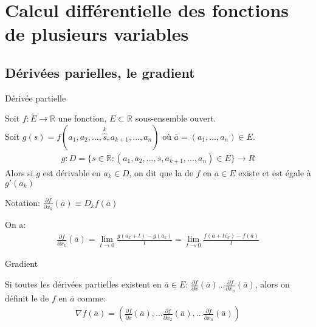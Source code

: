 \chapter{Calcul différentielle des fonctions de plusieurs variables}

    \section{Dérivées parielles, le gradient}
    \begin{parag}{Dérivée partielle}
        \begin{definition}
            Soit $f : E \to \mathbb{R}$ une fonction, $E \subset \mathbb{R}$ sous-ensemble ouvert. \\
        Soit $g(s) = f(a_1, a_2, \dots, \overbrace{s}^{k}, a_{k+1}, \dots, a_n)$ où $ \overline{a} = (a_1, \dots, a_n) \in E$.
        \begin{align*}
            g: D = \{ s \in \mathbb{R} : (a_1, a_2, \dots, s, a_{k+1}, \dots, a_n) \in E\} \to R
        \end{align*}
        Alors si $g$ est dérivable en $a_k \in D$, on dit que la  de $f$ en $ \overline{a} \in E$ existe et est égale à $g'(a_k)$
        \begin{framedremark}
            Notation: $ \frac{ \partial f}{ \partial x_k}( \overline{a}) \equiv D_k f( \overline{a})$
        \end{framedremark}
        \end{definition}
        
       On a:
        \begin{align*}
            \frac{ \partial f}{ \partial x_k} ( \overline{a}) = \lim_{ t \to 0} \frac{g(a_k + t) - g(a_k)}{t} = \lim_{t \to 0} \frac{f( \overline{a} + t \overline{e_k}) - f( \overline{a})}{t}
        \end{align*}
      
    \end{parag}
    
   \begin{parag}{Gradient}
       \begin{definition}
           Si toutes les dérivées partielles existent en $ \overline{a} \in E$: $ \frac{ \partial f}{ \partial x}( \overline{a})  \dots \frac{ \partial f}{ \partial x_n}( \overline{a})$, alors on définit le  de $f$ en $ \overline{a}$ comme:
           \begin{align*}
             \nabla  f( \overline{a}) = \left( \frac{ \partial f}{ \partial x}( \overline{a}), \dots \frac{ \partial f}{ \partial x_2}( \overline{a}) , \dots\frac{ \partial f}{ \partial x_n}( \overline{a}) \right) 
           \end{align*}
           
       \end{definition}
   
   \end{parag}
    
